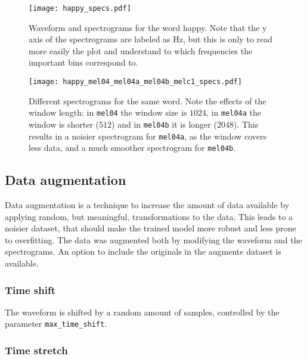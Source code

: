 \begin{figure}[t!]
    \centering
    \texttt{[image: happy\_specs.pdf]}
    \caption{
    Waveform and spectrograms for the word happy. Note that the y axis of the
spectrograms are labeled as Hz, but this is only to read more easily the plot
and understand to which frequencies the important bins correspond to. }%
    \label{fig:happy_specs}
\end{figure}

\begin{figure}[t!]
    \centering
    \texttt{[image: happy\_mel04\_mel04a\_mel04b\_melc1\_specs.pdf]}
    \caption{Different spectrograms for the same word. Note the effects of the
        window length: in \texttt{mel04} the window size is $1024$, in
        \texttt{mel04a} the window is shorter ($512$) and in \texttt{mel04b} it
        is longer ($2048$). This results in a noisier spectrogram for
        \texttt{mel04a}, as the window covers less data, and a much smoother
        spectrogram for \texttt{mel04b}.
    }%
    \label{fig:happy_mel01_mel04_mel06_melc1_specs}
\end{figure}


\subsection{Data augmentation}
\label{sec:data_augmentation}

Data augmentation is a technique to increase the amount of data available by
applying random, but meaningful, transformations to the data. This leads to a
noisier dataset, that should make the trained model more robust and less prone
to overfitting. The data was augmented both by modifying the waveform and the
spectrograms. An option to include the originals in the augmente dataset is
available.

\subsubsection{Time shift}

The waveform is shifted by a random amount of samples, controlled by the
parameter \texttt{max\_time\_shift}.

\subsubsection{Time stretch}

